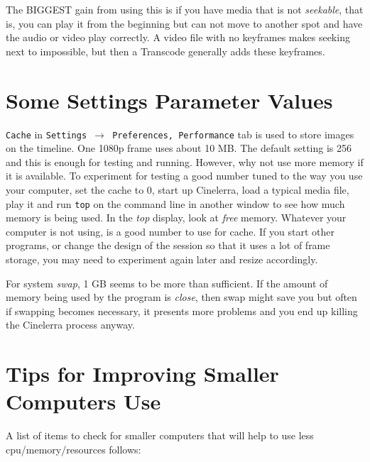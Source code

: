 The BIGGEST gain from using this is if you have media that is not \textit{seekable}, that is, you can play it from the beginning but can not move to another spot and have the audio or video play correctly. A video file with no keyframes makes seeking next to impossible, but then a Transcode generally adds these keyframes. 

\section{Some Settings Parameter Values}%
\label{sec:settings_parameter_values}

\texttt{Cache} in \texttt{Settings $\rightarrow$ Preferences, Performance} tab is used to store images on the timeline.  One 1080p frame uses about 10 MB.  The default setting is 256 and this is enough for testing and running.  However, why not use more memory if it is available.   To experiment for testing a good number tuned to the way you use your computer, set the cache to 0, start up Cinelerra, load a typical media file, play it and run \texttt{top} on the command line in another window to see how much memory is being used.  In the \textit{top} display, look at \textit{free} memory.  Whatever your computer is not using, is a good number to use for cache.  If you start other programs, or change the design of the session so that it uses a lot of frame storage, you may need to experiment again later and resize accordingly.

For system \textit{swap}, 1 GB seems to be more than sufficient.  If the amount of memory being used by the program is \textit{close}, then swap might save you but often if swapping becomes necessary, it presents more problems and you end up killing the Cinelerra process anyway.

\section{Tips for Improving Smaller Computers Use}%
\label{sec:tips_improving_smaller_computers}

A list of items to check for smaller computers that will help to use less cpu/memory/resources follows:

